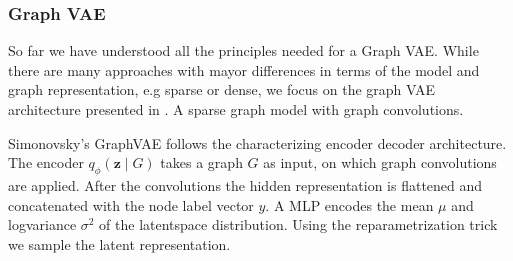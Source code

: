 \subsubsection{Graph VAE}
\label{ssec:GVAE}

So far we have understood all the principles needed for a Graph VAE. While there are many approaches with mayor differences in terms of the model and graph representation, e.g sparse or dense, we focus on the graph VAE architecture presented in \cite{simonovsky_graphvae_2018}. A sparse graph model with graph convolutions.


Simonovsky's GraphVAE follows the characterizing encoder decoder architecture.
The encoder $q_{\phi}(\mathbf{z} \mid {G})$ takes a graph ${G}$ as input, on which graph convolutions are applied. After the convolutions the hidden representation is flattened and concatenated with the node label vector $y$. A MLP encodes the mean $\mu$ and logvariance $\sigma^2$ of the latentspace distribution. Using the reparametrization trick we sample the latent representation.

